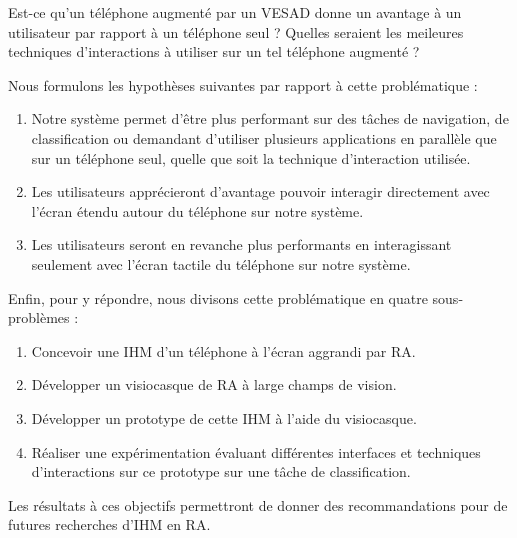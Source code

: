 \begin{displayquote}
  Est-ce qu'un téléphone augmenté par un VESAD donne un avantage à un utilisateur par rapport à un téléphone seul ? Quelles seraient les meileures techniques d'interactions à utiliser sur un tel téléphone augmenté ?
\end{displayquote}

Nous formulons les hypothèses suivantes par rapport à cette problématique :
\begin{enumerate}[label={(H\arabic*)}]
  \item Notre système	permet d'être plus performant sur des tâches de navigation, de classification ou demandant d'utiliser plusieurs applications en parallèle que sur un téléphone seul, quelle que soit la technique d'interaction utilisée.
  \item Les utilisateurs apprécieront d'avantage pouvoir interagir directement avec l'écran étendu autour du téléphone sur notre système.
  \item Les utilisateurs seront en revanche plus performants en interagissant seulement avec l'écran tactile du téléphone sur notre système.
\end{enumerate}

Enfin, pour y répondre, nous divisons cette problématique en quatre sous-problèmes :
\begin{enumerate}
  \item Concevoir une IHM d'un téléphone à l'écran aggrandi par RA.
  \item Développer un visiocasque de RA à large champs de vision.
  \item Développer un prototype de cette IHM à l'aide du visiocasque.
  \item Réaliser une expérimentation évaluant différentes interfaces et techniques d'interactions sur ce prototype sur une tâche de classification.
\end{enumerate}

Les résultats à ces objectifs permettront de donner des recommandations pour de futures recherches d'IHM en RA.